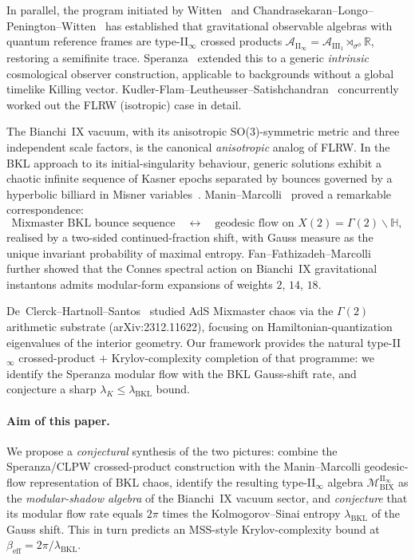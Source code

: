 \documentclass[12pt,a4paper]{article}
\begin{document}
In parallel, the program initiated by Witten~\cite{Witten2018,Witten2022}
and Chandrasekaran--Longo--Penington--Witten~\cite{CLPW2022} has
established that gravitational observable algebras with quantum
reference frames are type-II$_\infty$ crossed products
$\mathcal{A}_{\mathrm{II}_\infty} = \mathcal{A}_{\mathrm{III}_1}
\rtimes_{\sigma^\phi} \mathbb{R}$, restoring a semifinite trace.
Speranza~\cite{Speranza2025} extended this to a generic
\emph{intrinsic} cosmological observer construction, applicable to
backgrounds without a global timelike Killing vector.
Kudler-Flam--Leutheusser--Satishchandran~\cite{KLS2024} concurrently
worked out the FLRW (isotropic) case in detail.

The Bianchi~IX vacuum, with its anisotropic SO(3)-symmetric metric and
three independent scale factors, is the canonical \emph{anisotropic}
analog of FLRW.
In the BKL approach to its initial-singularity behaviour, generic
solutions exhibit a chaotic infinite sequence of Kasner epochs
separated by bounces governed by a hyperbolic billiard in Misner
variables~\cite{DamourHenneauxNicolai2002,CornishLevin1996}.
Manin--Marcolli~\cite{ManinMarcolli2015} proved a remarkable
correspondence:
\begin{equation}
  \text{Mixmaster BKL bounce sequence}
  \quad \longleftrightarrow \quad
  \text{geodesic flow on } X(2) = \Gamma(2)\backslash\mathbb{H},
  \label{eq:MM-corr}
\end{equation}
realised by a two-sided continued-fraction shift, with Gauss measure
as the unique invariant probability of maximal entropy.
Fan--Fathizadeh--Marcolli~\cite{FFM2015} further showed that the
Connes spectral action on Bianchi~IX gravitational instantons admits
modular-form expansions of weights $2$, $14$, $18$.

De~Clerck--Hartnoll--Santos~\cite{HartnollDCS2024} studied AdS
Mixmaster chaos via the $\Gamma(2)$ arithmetic substrate
(arXiv:2312.11622), focusing on Hamiltonian-quantization eigenvalues
of the interior geometry.
Our framework provides the natural type-II$_\infty$ crossed-product
$+$ Krylov-complexity completion of that programme: we identify the
Speranza modular flow with the BKL Gauss-shift rate, and conjecture
a sharp $\lambda_K \le \lambda_{\mathrm{BKL}}$ bound.

\paragraph{Aim of this paper.}
We propose a \emph{conjectural} synthesis of the two pictures: combine
the Speranza/CLPW crossed-product construction with the
Manin--Marcolli geodesic-flow representation of BKL chaos, identify
the resulting type-II$_\infty$ algebra
$\mathcal{M}_{\mathrm{BIX}}^{\mathrm{II}_\infty}$ as the
\emph{modular-shadow algebra} of the Bianchi~IX vacuum sector, and
\emph{conjecture} that its modular flow rate equals $2\pi$ times the
Kolmogorov--Sinai entropy $\lambda_{\mathrm{BKL}}$ of the Gauss shift.
This in turn predicts an MSS-style Krylov-complexity bound at
$\beta_{\mathrm{eff}} = 2\pi/\lambda_{\mathrm{BKL}}$.
\end{document}
